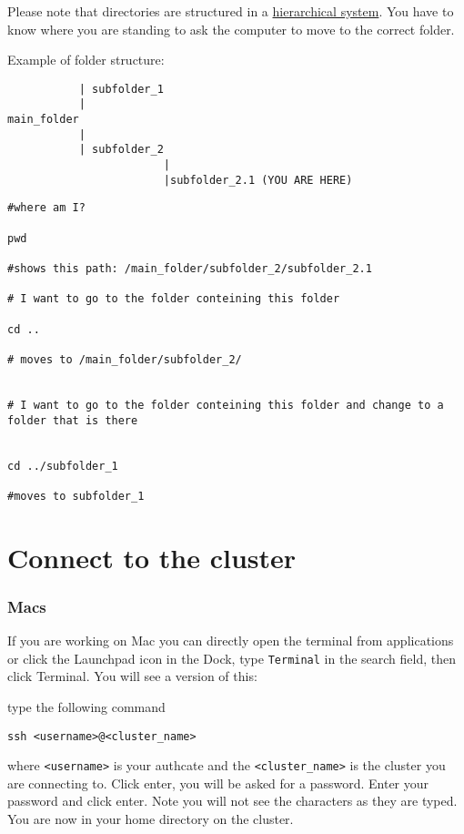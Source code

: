 \documentclass[
]{book}
\begin{document}
Please note that directories are structured in a \href{https://www.geeksforgeeks.org/structures-of-directory-in-operating-system/}{hierarchical system}. You have to know where you are standing to ask the computer to move to the correct folder.

Example of folder structure:

\begin{verbatim}
           | subfolder_1 
           | 
main_folder
           |
           | subfolder_2
                        |
                        |subfolder_2.1 (YOU ARE HERE)
\end{verbatim}

\begin{verbatim}
#where am I?

pwd

#shows this path: /main_folder/subfolder_2/subfolder_2.1

# I want to go to the folder conteining this folder

cd ..

# moves to /main_folder/subfolder_2/


# I want to go to the folder conteining this folder and change to a folder that is there


cd ../subfolder_1

#moves to subfolder_1
\end{verbatim}

\hypertarget{connect-to-the-cluster}{%
\chapter{Connect to the cluster}\label{connect-to-the-cluster}}

\hypertarget{macs}{%
\subsection{Macs}\label{macs}}

If you are working on Mac you can directly open the terminal from applications or click the Launchpad icon in the Dock, type \texttt{Terminal} in the search field, then click Terminal. You will see a version of this:

type the following command

\begin{verbatim}
ssh <username>@<cluster_name>
\end{verbatim}

where \texttt{\textless{}username\textgreater{}} is your authcate and the \texttt{\textless{}cluster\_name\textgreater{}} is the cluster you are connecting to. Click enter, you will be asked for a password. Enter your password and click enter. Note you will not see the characters as they are typed. You are now in your home directory on the cluster.
\end{document}
